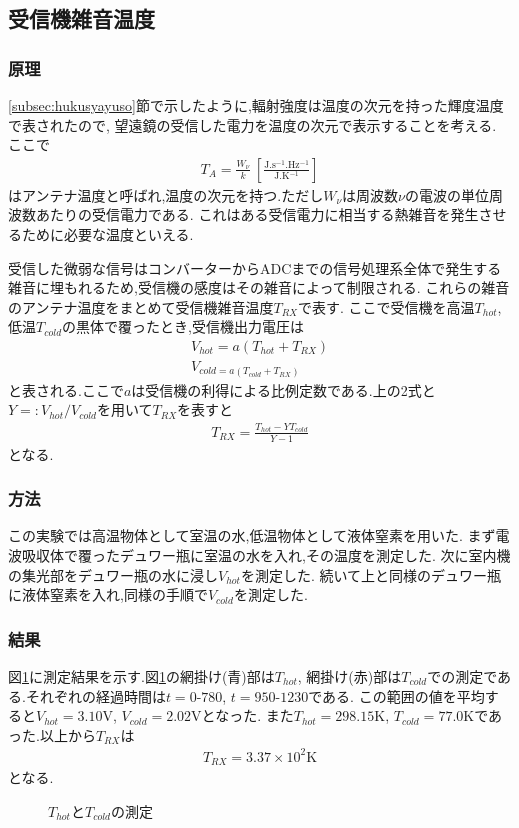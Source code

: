 \subsection{受信機雑音温度}
\subsubsection{原理}
\ref{subsec:hukusyayuso}節で示したように,輻射強度は温度の次元を持った輝度温度で表されたので,
望遠鏡の受信した電力を温度の次元で表示することを考える.
ここで
\begin{align}
  T_A=\frac{W_\nu}{k}\ \left[\frac{\si{\joule.\second^{-1}.\hertz^{-1}}}{\si{\joule.\kelvin^{-1}}}\right]
\end{align}
はアンテナ温度と呼ばれ,温度の次元を持つ.ただし$W_\nu$は周波数$\nu$の電波の単位周波数あたりの受信電力である.
これはある受信電力に相当する熱雑音を発生させるために必要な温度といえる.

受信した微弱な信号はコンバーターからADCまでの信号処理系全体で発生する雑音に埋もれるため,受信機の感度はその雑音によって制限される.
これらの雑音のアンテナ温度をまとめて受信機雑音温度$T_{RX}$で表す.
ここで受信機を高温$T_{hot}$,低温$T_{cold}$の黒体で覆ったとき,受信機出力電圧は
\begin{align}
  V_{hot}=a(T_{hot}+T_{RX})\\
  V_{cold=a(T_{cold}+T_{RX})}
\end{align}
と表される.ここで$a$は受信機の利得による比例定数である.上の2式と$Y=:V_{hot}/V_{cold}$を用いて$T_{RX}$を表すと
\begin{align}
  T_{RX}=\frac{T_{hot}-YT_{cold}}{Y-1}
\end{align}
となる.
\subsubsection{方法}
この実験では高温物体として室温の水,低温物体として液体窒素を用いた.
まず電波吸収体で覆ったデュワー瓶に室温の水を入れ,その温度を測定した.
次に室内機の集光部をデュワー瓶の水に浸し$V_{hot}$を測定した.
続いて上と同様のデュワー瓶に液体窒素を入れ,同様の手順で$V_{cold}$を測定した.
\subsubsection{結果}
図\ref{fig:Thot_Tcold}に測定結果を示す.図\ref{fig:Thot_Tcold}の網掛け(青)部は$T_{hot}$,
網掛け(赤)部は$T_{cold}$での測定である.それぞれの経過時間は$t=0$-$780$, $t=950$-$1230$である.
この範囲の値を平均すると$V_{hot}=3.10\si{\volt}$, $V_{cold}=2.02\si{\volt}$となった.
また$T_{hot}=298.15\si{\kelvin}$, $T_{cold}=77.0\si{\kelvin}$であった.以上から$T_{RX}$は
\begin{align}
  T_{RX}=3.37\times10^2\si{\kelvin}
\end{align}
となる.
\begin{figure}[hptb]
\begin{center}

\caption{$T_{hot}$と$T_{cold}$の測定}
\label{fig:Thot_Tcold}
\end{center}
\end{figure}